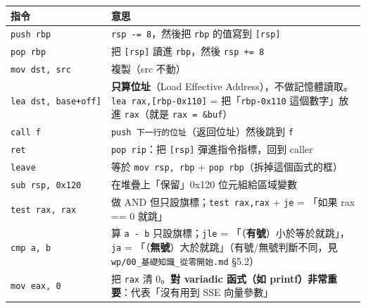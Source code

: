 \documentclass[10pt,a4paper]{article}
\newcounter{none}
\begin{document}
{\def\LTcaptype{none} %
\begin{longtable}[]{@{}
  >{\raggedright\arraybackslash}p{}
  >{\raggedright\arraybackslash}p{}@{}}
\toprule\noalign{}
\begin{minipage}[b]{\linewidth}\raggedright
指令
\end{minipage} & \begin{minipage}[b]{\linewidth}\raggedright
意思
\end{minipage} \\
\midrule\noalign{}
\endhead
\bottomrule\noalign{}
\endlastfoot
\texttt{push\ \allowbreak{}rbp} & \texttt{rsp\ \allowbreak{}-=\ \allowbreak{}8}，然後把 \texttt{rbp} 的值寫到
\texttt{{[}rsp{]}} \\
\texttt{pop\ \allowbreak{}rbp} & 把 \texttt{{[}rsp{]}} 讀進 \texttt{rbp}，然後
\texttt{rsp\ \allowbreak{}+=\ \allowbreak{}8} \\
\texttt{mov\ \allowbreak{}dst,\allowbreak{}\ \allowbreak{}src} & 複製（src 不動） \\
\texttt{lea\ \allowbreak{}dst,\allowbreak{}\ \allowbreak{}{[}base+off{]}} & \textbf{只算位址}（Load Effective
Address），不做記憶體讀取。\texttt{lea\ \allowbreak{}rax,{[}rbp-\allowbreak{}0x110{]}} =
把「\texttt{rbp-\allowbreak{}0x110} 這個數字」放進 \texttt{rax}（就是
\texttt{rax\ \allowbreak{}=\ \allowbreak{}\&\allowbreak{}buf}） \\
\texttt{call\ \allowbreak{}f} & \texttt{push\ \allowbreak{}下一行的位址}（返回位址）然後跳到
\texttt{f} \\
\texttt{ret} & \texttt{pop\ \allowbreak{}rip}：把 \texttt{{[}rsp{]}}
彈進指令指標，回到 caller \\
\texttt{leave} & 等於 \texttt{mov\ \allowbreak{}rsp,\allowbreak{}\ \allowbreak{}rbp} +
\texttt{pop\ \allowbreak{}rbp}（拆掉這個函式的框） \\
\texttt{sub\ \allowbreak{}rsp,\allowbreak{}\ \allowbreak{}0x120} & 在堆疊上「保留」0x120 位元組給區域變數 \\
\texttt{test\ \allowbreak{}rax,\allowbreak{}\ \allowbreak{}rax} & 做 AND 但只設旗標；\texttt{test\ \allowbreak{}rax,\allowbreak{}rax} +
\texttt{je} = 「如果 rax == 0 就跳」 \\
\texttt{cmp\ \allowbreak{}a,\allowbreak{}\ \allowbreak{}b} & 算 \texttt{a\ \allowbreak{}-\allowbreak{}\ \allowbreak{}b} 只設旗標；\texttt{jle} =
「（\textbf{有號}）小於等於就跳」，\texttt{ja} =
「（\textbf{無號}）大於就跳」（有號/無號判斷不同，見
\texttt{wp/\allowbreak{}00\_\allowbreak{}基礎知識\_\allowbreak{}從零開始.\allowbreak{}md} §5.2） \\
\texttt{mov\ \allowbreak{}eax,\allowbreak{}\ \allowbreak{}0} & 把 \texttt{rax} 清 0。\textbf{對 variadic
函式（如 printf）非常重要}：代表「沒有用到 SSE 向量參數」 \\
\end{longtable}
}
\end{document}
